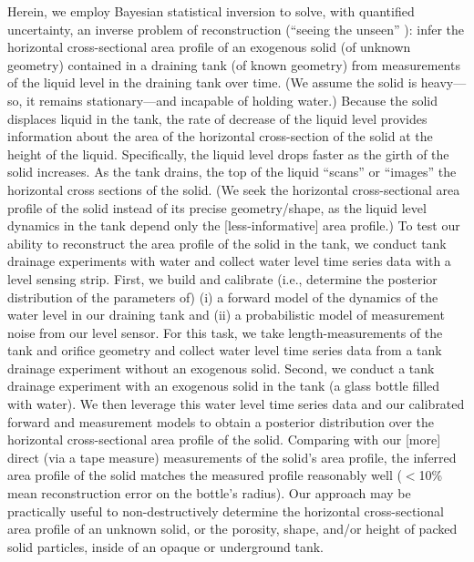 \documentclass[a4paper,fleqn]{cas-dc}
\begin{document}
Herein, we employ Bayesian statistical inversion \cite{calvetti2018inverse,waqar2023tutorial,kaipio2006statistical,dashti2013bayesian} to solve, with quantified uncertainty, an inverse problem of reconstruction (``seeing the unseen'' \cite{uhlmann2014inverse}): infer the horizontal cross-sectional area profile of an exogenous solid (of unknown geometry) contained in a draining tank (of known geometry) from measurements of the liquid level in the draining tank over time. 
(We assume the solid is heavy---so, it remains stationary---and incapable of holding water.)
Because the solid displaces liquid in the tank, the rate of decrease of the liquid level provides information about the area of the horizontal cross-section of the solid at the height of the liquid. Specifically, the liquid level drops faster as the girth of the solid increases. 
As the tank drains, the top of the liquid ``scans'' or ``images'' the horizontal cross sections of the solid.
(We seek the horizontal cross-sectional area profile of the solid instead of its precise geometry/shape, as the liquid level dynamics in the tank depend only the [less-informative] area profile.)
To test our ability to reconstruct the area profile of the solid in the tank, we conduct tank drainage experiments with water and collect water level time series data with a level sensing strip. 
First, we build and calibrate (i.e., determine the posterior distribution of the parameters of) (i) a forward model of the dynamics of the water level in our draining tank and (ii) a probabilistic model of measurement noise from our level sensor.
For this task, we take length-measurements of the tank and orifice geometry and collect water level time series data from a tank drainage experiment without an exogenous solid. 
Second, we conduct a tank drainage experiment with an exogenous solid in the tank (a glass bottle filled with water). We then leverage this water level time series data and our calibrated forward and measurement models to obtain a posterior distribution over the horizontal cross-sectional area profile of the solid.
Comparing with our [more] direct (via a tape measure) measurements of the solid's area profile, the inferred area profile of the solid matches the measured profile reasonably well ($<$10\% mean reconstruction error on the bottle's radius). Our approach may be practically useful to non-destructively determine the horizontal cross-sectional area profile of an unknown solid, or the porosity, shape, and/or height of packed solid particles, inside of an opaque or underground tank.
\end{document}
